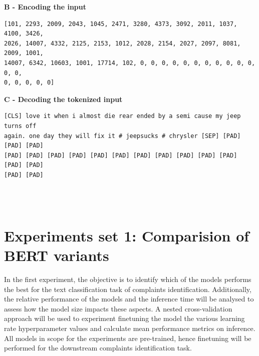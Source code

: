 \textbf{B - Encoding the input}\newline

\begin{adjustbox}{minipage={\textwidth},fbox}
    \begin{verbatim}[101, 2293, 2009, 2043, 1045, 2471, 3280, 4373, 3092, 2011, 1037, 4100, 3426, 
2026, 14007, 4332, 2125, 2153, 1012, 2028, 2154, 2027, 2097, 8081, 2009, 1001, 
14007, 6342, 10603, 1001, 17714, 102, 0, 0, 0, 0, 0, 0, 0, 0, 0, 0, 0, 0, 0, 
0, 0, 0, 0, 0]\end{verbatim}
\end{adjustbox} \newline\newline

\textbf{C - Decoding the tokenized input}\newline

\begin{adjustbox}{minipage={\textwidth},fbox}
    \begin{verbatim}[CLS] love it when i almost die rear ended by a semi cause my jeep turns off 
again. one day they will fix it # jeepsucks # chrysler [SEP] [PAD] [PAD] [PAD] 
[PAD] [PAD] [PAD] [PAD] [PAD] [PAD] [PAD] [PAD] [PAD] [PAD] [PAD] [PAD] [PAD] 
[PAD] [PAD]\end{verbatim}
\end{adjustbox}\\ \\

\section{Experiments set 1: Comparision of BERT variants}
In the first experiment, the objective is to identify which of the models performs the best for the text classification task of complaints identification. Additionally, the relative performance of the models and the inference time will be analysed to assess how the model size impacts these aspects. A nested cross-validation approach will be used to experiment finetuning the model the various learning rate hyperparameter values and calculate mean performance metrics on inference. All models in scope for the experiments are pre-trained, hence finetuning will be performed for the downstream complaints identification task.\\

